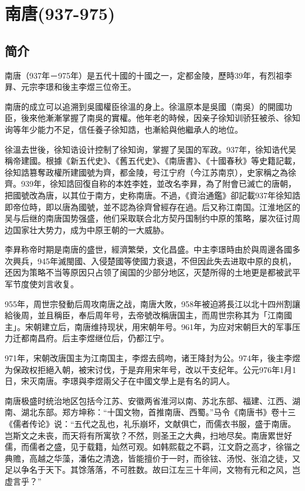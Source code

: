 

\section{南唐\tiny(937-975)}

\subsection{简介}

南唐（937年－975年）是五代十國的十國之一，定都金陵，歷時39年，有烈祖李昪、元宗李璟和後主李煜三位帝王。

南唐的成立可以追溯到吳國權臣徐溫的身上。徐溫原本是吳國（南吳）的開國功臣，後來他漸漸掌握了南吳的實權。他年老的時候，因亲子徐知训骄狂被杀、徐知询等年少能力不足，信任養子徐知誥，也漸給與他繼承人的地位。

徐溫去世後，徐知诰设计控制了徐知询，掌握了吴国的军政。937年，徐知诰代吴稱帝建國。根據《新五代史》、《舊五代史》、《南唐書》、《十國春秋》等史籍記載，徐知誥篡奪政權所建國號为齊，都金陵，号江宁府（今江苏南京），史家稱之為徐齊。939年，徐知誥回復自称的本姓李姓，並改名李昪，為了附會已滅亡的唐朝，把國號改為唐，以其位于南方，史称南唐。不過，《資治通鑑》卻記載937年徐知誥即帝位時，即以唐為國號，並不認為徐齊曾經存在過。后又称江南国。江淮地区的吴与后继的南唐国势强盛，他们采取联合北方契丹国制约中原的策略，屡次征讨周边国家壮大势力，成为中原王朝的一大威胁。

李昪称帝时期是南唐的盛世，經濟繁榮，文化昌盛。中主李璟時由於與周邊各國多次興兵，945年滅閩國、入侵楚國等使國力衰退，不但因此失去进取中原的良机，还因为策略不当等原因只占领了闽国的少部分地区，灭楚所得的土地更是都被武平军节度使刘言收复。

955年，周世宗發動后周攻南唐之战，南唐大敗，958年被迫將長江以北十四州割讓給後周，並且稱臣，奉后周年号，去帝號改稱唐国主，而周世宗称其为「江南國主」。宋朝建立后，南唐维持现状，用宋朝年号。961年，为应对宋朝巨大的军事压力迁都南昌府。后主李煜继位后，仍都江宁。

971年，宋朝改唐国主为江南国主，李煜去鸱吻，诸王降封为公。974年，後主李煜为保政权拒絕入朝，被宋讨伐，于是弃用宋年号，改以干支纪年。公元976年1月1日，宋灭南唐。李璟與李煜兩父子在中國文學上是有名的詞人。

南唐极盛时统治地区包括今江苏、安徽两省淮河以南、苏北东部、福建、江西、湖南、湖北东部。郑方坤称：“十国文物，首推南唐、西蜀。”马令《南唐书》卷十三《儒者传论》说：“五代之乱也，礼乐崩坏，文献俱亡，而儒衣书服，盛于南唐。岂斯文之未丧，而天将有所寓欤？不然，则圣王之大典，扫地尽矣。南唐累世好儒，而儒者之盛，见于载籍，灿然可观。如韩熙载之不羁，江文蔚之高才，徐锴之典赡，高越之华藻，潘佑之清逸，皆能擅价于一时，而徐铉、汤悦、张洎之徒，又足以争名于天下。其馀落落，不可胜数。故曰江左三十年间，文物有元和之风，岂虚言乎？”






